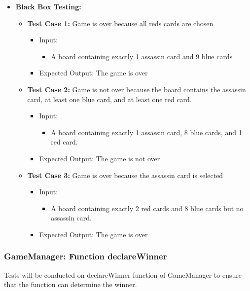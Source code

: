 \documentclass[12pt]{article}
\begin{document}
\begin{itemize}
    \item \textbf{Black Box Testing:}
    \begin{itemize}
       \item \textbf{Test Case 1:} Game is over because all reds cards are chosen
            \begin{itemize}
            \item Input:
                \begin{itemize}
                    \item A board containing exactly 1 assassin card and 9 blue cards
                \end{itemize}
            \item Expected Output: The game is over
            \end{itemize}
        \item \textbf{Test Case 2:} Game is not over because the board contains the assassin card, at least one blue card, and at least one red card.
            \begin{itemize}
            \item Input:
                \begin{itemize}
                    \item A board containing exactly 1 assassin card, 8 blue cards, and 1 red card.
                \end{itemize}
            \item Expected Output: The game is not over
            \end{itemize}
        \item \textbf{Test Case 3:} Game is over because the assassin card is selected
            \begin{itemize}
            \item Input:
                \begin{itemize}
                    \item A board containing exactly 2 red cards and 8 blue cards but no assassin card.
                \end{itemize}
            \item Expected Output: The game is over
            \end{itemize}
    \end{itemize}
\end{itemize}

\subsubsection{GameManager: Function declareWinner}
Tests will be conducted on declareWinner function of GameManager to ensure that the function can determine the winner.
\end{document}
